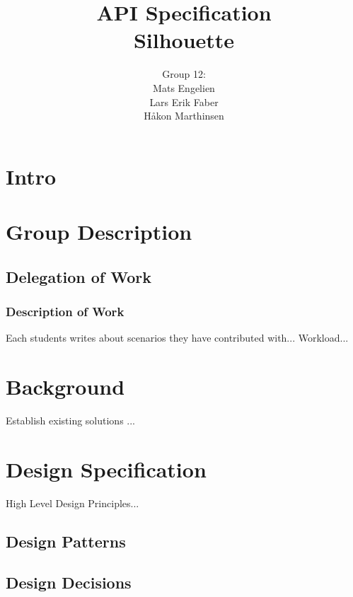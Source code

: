 \documentclass[12pt]{article}
\begin{document}
\title{%
    API Specification\\
    \large Silhouette}
\author{%
    Group 12:\\
    Mats Engelien\\
    Lars Erik Faber\\
    Håkon Marthinsen}
\date{}
\maketitle

\newpage

\tableofcontents

\newpage

\section{Intro}

\section{Group Description}

\subsection{Delegation of Work}

\subsubsection{Description of Work}
Each students writes about scenarios they have contributed with...
Workload...

\section{Background}
Establish existing solutions ...

\section{Design Specification}
High Level Design Principles...

\subsection{Design Patterns}

\subsection{Design Decisions}
\end{document}
